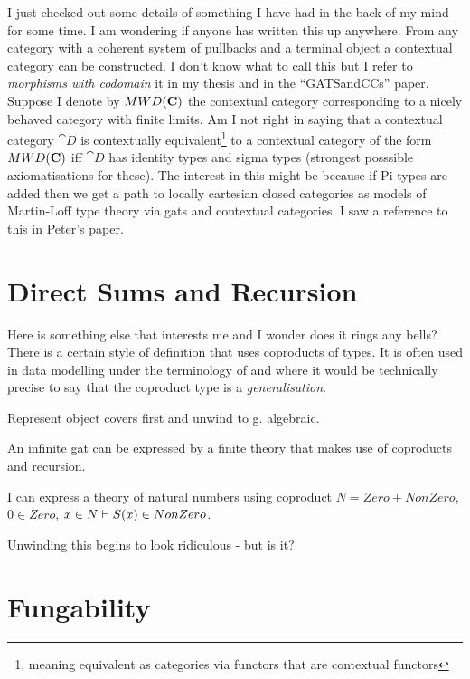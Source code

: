 \documentclass[10pt,a4paper]{article}
\theoremstyle{remark}
\begin{document}
\note 
I just checked out some details of something I have had in the back of my mind for some time. I am wondering if anyone has written this up anywhere. From any category with a coherent system of pullbacks and a terminal object a contextual category can be constructed. I don't know what to call this but 
I refer to \textit{morphisms with codomain} it in my thesis and in the ``GATSandCCs'' paper.
Suppose I denote by $MWD(\textbf{C})$ the contextual category corresponding to a nicely behaved category \catcw with finite limits. Am I not right in saying that a contextual category $\cat{D}$ is contextually equivalent\footnote{meaning equivalent as categories via functors that are contextual functors} to 
a contextual category of the form $MWD(\textbf{C})$ iff $\cat{D}$ has identity types and sigma types
(strongest posssible axiomatisations for these). The interest in this might be because if Pi types are added then we get  a path to locally cartesian closed categories as models of Martin-Loff type theory via gats and contextual categories. I saw a reference to this in Peter's paper.


\section{Direct Sums and Recursion}

\note Here is something else that interests me and I wonder does it rings any bells?
There is a certain style of definition that uses coproducts of types. It is often used in data modelling 
under the terminology of  and where it would be technically precise to say that the
coproduct type is a \textit{generalisation}.

Represent object covers first and unwind to g. algebraic.

An infinite gat can be expressed by a finite theory that makes use of coproducts and recursion.
  
I can express a theory of natural numbers using coproduct $N = Zero + NonZero$,
$0 \in Zero$, $x \in N \vdash S(x) \in NonZero$.   

Unwinding this begins to look ridiculous - but is it?


\section{Fungability}


%

 

\end{document}
